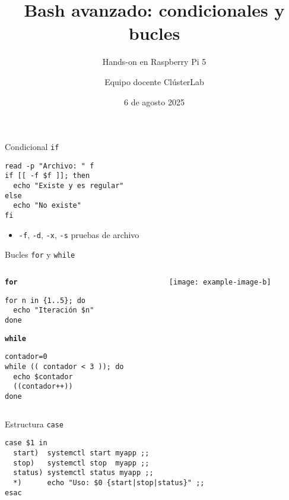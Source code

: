 \documentclass[aspectratio=169, professionalfonts]{beamer}
\title[ClústerLab • Día 2]{Bash avanzado: condicionales y bucles}
\subtitle{Hands-on en Raspberry Pi 5}
\author{Equipo docente ClústerLab}
\date{6 de agosto 2025}
\begin{document}
\begin{frame}[plain]
  \titlepage
\end{frame}

\begin{frame}[fragile]{Condicional \texttt{if}}
\begin{verbatim}
read -p "Archivo: " f
if [[ -f $f ]]; then
  echo "Existe y es regular"
else
  echo "No existe"
fi
\end{verbatim}
\pause
\begin{itemize}
  \item \texttt{-f}, \texttt{-d}, \texttt{-x}, \texttt{-s}  pruebas de archivo
\end{itemize}
\end{frame}

\begin{frame}[fragile]{Bucles \texttt{for} y \texttt{while}}
\begin{columns}[T]
\begin{column}{0.55\textwidth}
\textbf{\texttt{for}}
\begin{verbatim}
for n in {1..5}; do
  echo "Iteración $n"
done
\end{verbatim}

\textbf{\texttt{while}}
\begin{verbatim}
contador=0
while (( contador < 3 )); do
  echo $contador
  ((contador++))
done
\end{verbatim}
\end{column}
\begin{column}{0.4\textwidth}
\texttt{[image: example-image-b]}
\end{column}
\end{columns}
\end{frame}

\begin{frame}[fragile]{Estructura \texttt{case}}
\begin{verbatim}
case $1 in
  start)  systemctl start myapp ;;
  stop)   systemctl stop  myapp ;;
  status) systemctl status myapp ;;
  *)      echo "Uso: $0 {start|stop|status}" ;;
esac
\end{verbatim}
\end{frame}
\end{document}
